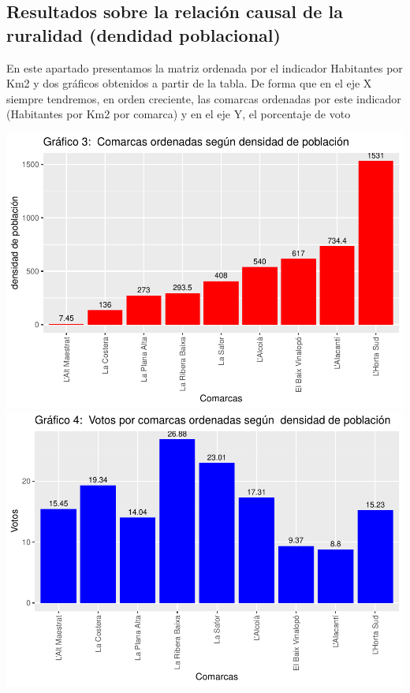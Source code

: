 \documentclass[
]{article}
\begin{document}
\hypertarget{resultados-sobre-la-relaciuxf3n-causal-de-la-ruralidad-dendidad-poblacional}{%
\subsection{Resultados sobre la relación causal de la ruralidad
(dendidad
poblacional)}\label{resultados-sobre-la-relaciuxf3n-causal-de-la-ruralidad-dendidad-poblacional}}

En este apartado presentamos la matriz ordenada por el indicador
Habitantes por Km2 y dos gráficos obtenidos a partir de la tabla. De
forma que en el eje X siempre tendremos, en orden creciente, las
comarcas ordenadas por este indicador (Habitantes por Km2 por comarca) y
en el eje Y, el porcentaje de voto

\includegraphics{votovalencianista-ea2023_files/figure-latex/ordenDensidadpoblacional-1.pdf}
\includegraphics{votovalencianista-ea2023_files/figure-latex/ordenDensidadpoblacional-2.pdf}
\end{document}
